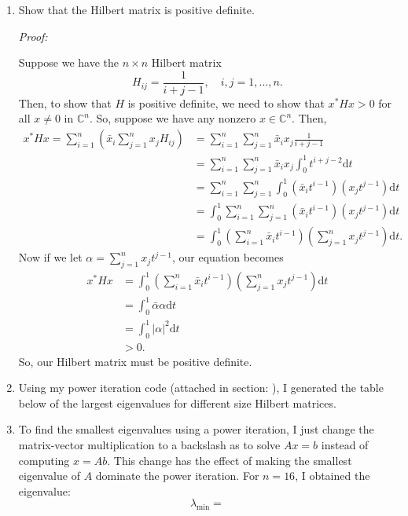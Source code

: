 \documentclass[a4paper,12pt]{article}
\newcommand{\comps}{\mathbb{C}}
\newcommand{\abs}[1]{\left| #1 \right|}
\newcommand{\dd}{\mathrm{d}}
\newenvironment{proof}[2][$\square$]
    {\setlength{\parskip}{0pt}\par\textit{Proof:} #2\setlength{\parskip}{0.25cm}
        \savebox{\qed}{#1}
        \begin{adjustwidth}{\widthof{Proof:}}{}
    }
    {
        \hfill\usebox{\qed}\end{adjustwidth}
    }
\begin{document}
\begin{enumerate}[label = (\arabic*)]
	\item Show that the Hilbert matrix is positive definite.
	
	\begin{proof}{}
		Suppose we have the $ n \times n $ Hilbert matrix
		\[
			H_{ij} = \frac{1}{i + j - 1}, \quad i,j = 1, \ldots, n.
		\]
		Then, to show that $ H $ is positive definite, we need to show that $ x^* H x > 0 $ for all $ x \neq 0 $ in $ \comps^n $. So, suppose we have any nonzero $ x \in \comps^n $.
		Then,
		\begin{align*}
			x^* H x = \sum_{i = 1}^{n} \left(\bar{x}_i \sum_{j = 1}^{n} x_j H_{ij}\right) &= \sum_{i = 1}^{n} \sum_{j = 1}^{n} \bar{x}_i x_j \frac{1}{i + j - 1} \\
			&= \sum_{i = 1}^{n} \sum_{j = 1}^{n} \bar{x}_i x_j \int_{0}^{1} t^{i + j - 2} \dd t \\
			&= \sum_{i = 1}^{n} \sum_{j = 1}^{n} \int_{0}^{1} (\bar{x}_i t^{i - 1}) (x_j t^{j - 1}) \dd t \\
			&= \int_{0}^{1} \sum_{i = 1}^{n} \sum_{j = 1}^{n} (\bar{x}_i t^{i - 1}) (x_j t^{j - 1}) \dd t \\
			&= \int_{0}^{1} \left(\sum_{i = 1}^{n} \bar{x}_i t^{i - 1}\right) \left(\sum_{j = 1}^{n} x_j t^{j - 1}\right) \dd t.
		\end{align*}
		Now if we let $ \alpha = \sum_{j = 1}^{n} x_j t^{j - 1} $, our equation becomes
		\begin{align*}
			x^* H x &= \int_{0}^{1} \left(\sum_{i = 1}^{n} \bar{x}_i t^{i - 1}\right) \left(\sum_{j = 1}^{n} x_j t^{j - 1}\right) \dd t \\
			&= \int_{0}^{1} \bar{\alpha} \alpha \dd t \\
			&= \int_{0}^{1} \abs{\alpha}^2 \dd t \\
			&> 0.
		\end{align*}
		So, our Hilbert matrix must be positive definite.
	\end{proof}

	\newpage
	\item Using my power iteration code (attached in section: ), I generated the table below of the largest eigenvalues for different size Hilbert matrices.
	
	\newpage
	\item To find the smallest eigenvalues using a power iteration, I just change the matrix-vector multiplication to a backslash as to solve $ Ax = b $ instead of computing $ x = Ab $. This change has the effect of making the smallest eigenvalue of $ A $ dominate the power iteration. For $ n = 16 $, I obtained the eigenvalue:
	\[
		\lambda_{\min} = 
	\]
	

\end{enumerate}
\end{document}
